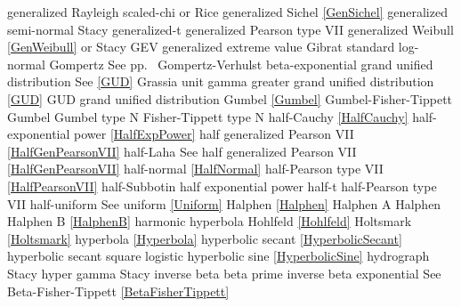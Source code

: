 generalized Rayleigh	 		\dotfill	scaled-chi or Rice					\ncite	%
generalized Sichel				\dotfill	\eqref{GenSichel}					\mcite{\self}
generalized semi-normal			\dotfill	Stacy 								   	%
generalized-t					\dotfill	generalized Pearson type VII		\ncite
generalized Weibull				\dotfill	\eqref{GenWeibull} or Stacy			\ncite	%
GEV 							\dotfill	generalized extreme value 			\ncite	%
Gibrat							\dotfill	standard log-normal 				\ncite 	%
Gompertz						\dotfill 	See pp.~\pageref{Gompertz}			\ncite
Gompertz-Verhulst				\dotfill	beta-exponential 					    	%
grand unified distribution		\dotfill	See \eqref{GUD}						\mcite{\self}	%
Grassia							\dotfill	unit gamma							
greater grand unified distribution \dotfill	\eqref{GUD}							\mcite{\self}
GUD								\dotfill	grand unified distribution			\mcite{\self}	%
Gumbel 							\dotfill	\eqref{Gumbel} 						\ncite	%
Gumbel-Fisher-Tippett			\dotfill	Gumbel 								\ncite 	%
Gumbel type N 					\dotfill	Fisher-Tippett type N 				\ncite	%
%
half-Cauchy						\dotfill	\eqref{HalfCauchy}					\ncite	%
half-exponential power			\dotfill	\eqref{HalfExpPower}				\ncite	%
half generalized Pearson VII	\dotfill	\eqref{HalfGenPearsonVII}			\ncite	%
half-Laha						\dotfill	See half generalized Pearson VII \eqref{HalfGenPearsonVII}	\mcite{\self}	%
half-normal 					\dotfill	\eqref{HalfNormal}					\ncite	%
half-Pearson type VII			\dotfill	\eqref{HalfPearsonVII} 				\ncite	%
half-Subbotin					\dotfill	half exponential power				\ncite	%
half-t							\dotfill	half-Pearson type VII				\ncite	%
half-uniform 					\dotfill	See uniform \eqref{Uniform} 		\ncite	%
Halphen							\dotfill	\eqref{Halphen}						\ncite
Halphen A						\dotfill	Halphen								\ncite
Halphen B						\dotfill	\eqref{HalphenB}					\ncite
harmonic						\dotfill	hyperbola							\ncite
Hohlfeld						\dotfill	\eqref{Hohlfeld}					\mcite{\self}	%
Holtsmark						\dotfill	\eqref{Holtsmark}					\ncite
hyperbola						\dotfill	\eqref{Hyperbola}					\ncite	
hyperbolic secant 				\dotfill	\eqref{HyperbolicSecant}			\ncite	%
hyperbolic secant square		\dotfill	logistic 							\ncite	%
hyperbolic sine					\dotfill	\eqref{HyperbolicSine}				\mcite{\self}	%
hydrograph						\dotfill	Stacy 								\ncite	%
hyper gamma   					\dotfill	Stacy								\ncite	%
%
inverse beta					\dotfill	beta prime 							\ncite	%
inverse beta exponential 		\dotfill	See Beta-Fisher-Tippett \eqref{BetaFisherTippett}\ncite
